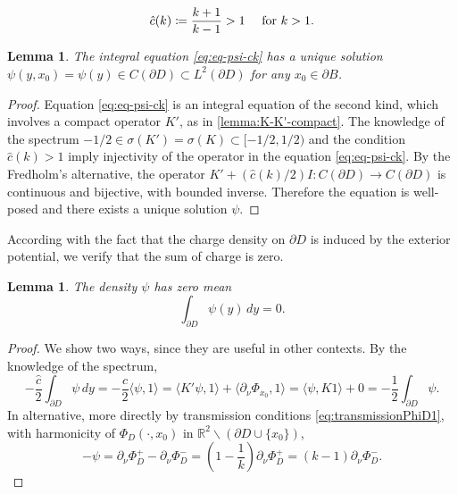 \documentclass[10pt, a4paper, twoside, openright]{book}
\theoremstyle{definition}
\theoremstyle{plain}
\theoremstyle{plain}
\theoremstyle{plain}
\theoremstyle{plain}
\theoremstyle{plain}
\newtheorem{lemma}[subsection]{Lemma}
\theoremstyle{plain}
\theoremstyle{plain}
\theoremstyle{plain}
\begin{document}
\begin{equation}
 \hat{c}(k)\coloneqq\dfrac{k+1}{k-1} > 1 \quad \textup{ for } k>1.
\end{equation}
\begin{lemma}
 The integral equation \eqref{eq:eq-psi-ck} has a unique solution $\psi(y,x_0)=\psi(y) \in C(\partial D) \subset L^2(\partial D)$ for any $x_0 \in \partial B$.
\end{lemma}
\begin{proof}
 Equation \eqref{eq:eq-psi-ck} is an integral equation of the second kind, which involves a compact operator $K'$, 
 as in \ref{lemma:K-K'-compact}. The knowledge of the spectrum $-1/2 \in \sigma(K')=\sigma(K) \subset [-1/2,1/2)$ and the condition $\hat{c}(k)>1$ imply injectivity of the operator in the equation \eqref{eq:eq-psi-ck}. 
 By the Fredholm's alternative, the operator $K'+(\hat{c}(k)/2)I:C(\partial D)\to C(\partial D)$ is continuous and bijective, with bounded inverse.
 Therefore the equation is well-posed and there exists a unique solution $\psi$.
\end{proof}
According with the fact that the charge density on $\partial D$ is induced by the exterior 
potential, we verify that the sum of charge is zero.
\begin{lemma}
 The density $\psi$ has zero mean
 \begin{equation}
  \int_{\partial D} \psi(y)\, dy = 0.
 \end{equation}
\end{lemma}
\begin{proof}
We show two ways, since they are useful in other contexts. By the knowledge of the spectrum,
 \begin{equation*}
  -\frac{\hat{c}}{2} \int_{\partial D} \psi\,dy = -\frac{\hat{c}}{2} \langle \psi,1\rangle = \langle K'\psi,1\rangle + \langle \partial_\nu\Phi_{x_0},1\rangle = \langle \psi,K 1\rangle + 0 = -\frac{1}{2}\int_{\partial D} \psi.
 \end{equation*}
 In alternative, more directly by transmission conditions \eqref{eq:transmissionPhiD1}, with harmonicity of $\Phi_D(\cdot,x_0)$ in $\mathbb{R}^2\backslash(\partial D\cup\{x_0\})$,
 \begin{equation*}
  -\psi=\partial_\nu \Phi_D^+-\partial_\nu \Phi_D^-=(1-\frac{1}{k})\partial_\nu \Phi_D^+ = (k-1)\partial_\nu \Phi_D^-.
 \end{equation*} 
\end{proof}
\end{document}
